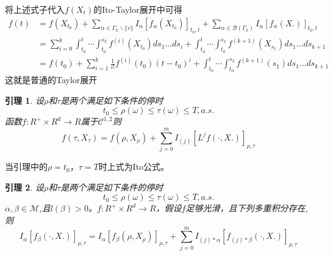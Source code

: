 \documentclass{article}%
\newtheorem{lemma}{\bf 引理}[section]
\begin{document}
将上述式子代入$f(X_t)$的Ito-Taylor展开中可得
\begin{equation}
\begin{aligned}
 f(t)&=f\left(X_{t_{0}}\right)+\sum_{\alpha \in \Gamma_{k} \backslash\{v\}} I_{\alpha}\left[f_{\alpha}\left(X_{t_{0}}\right)\right]_{t_{0}, t}+\sum_{\alpha \in \mathcal{B}\left(\Gamma_{k}\right)} I_{\alpha}\left[f_{\alpha}(X .)\right]_{t_{0}, t}\\
&=\sum_{i=0}^{k} \int_{t_{0}}^{t} \cdots \int_{t_{0}}^{s_{2}} f^{(i)}\left(X_{t_{0}}\right) d s_{1} \ldots d s_{i} 
+\int_{t_{0}}^{t} \cdots \int_{t_{0}}^{s_{2}} f^{(k+1)}\left(X_{s_{1}}\right) d s_{1} \ldots d s_{k+1} \\
&=f\left(t_{0}\right)+\sum_{i=1}^{k} \frac{1}{i !} f^{(i)}\left(t_{0}\right)\left(t-t_{0}\right)^{i}+\int_{t_{0}}^{t} \cdots \int_{t_{0}}^{s_{2}} f^{(k+1)}\left(s_{1}\right) d s_{1} \ldots d s_{k+1}
\end{aligned}
\end{equation}
这就是普通的Taylor展开
\begin{lemma}
	设$\rho$和$\tau$是两个满足如下条件的停时
	$$t_0 \leq \rho(\omega) \leq \tau(\omega) \leq T,a.s.$$
	函数$f: R^{+} \times R^{d} \rightarrow R$属于$\mathcal{C}^{1,2}$则
	\begin{equation}
	f\left(\tau, X_{\tau}\right)=f\left(\rho, X_{\rho}\right)+\sum_{j=0}^{m} I_{(j)}\left[L^{j} f(\cdot, X .)\right]_{\rho, \tau}
	\end{equation}	
\end{lemma}
	当引理中的$\rho=t_0$，$\tau=T$时上式为Ito公式。
\begin{lemma}
	设$\rho$和$\tau$是两个满足如下条件的停时
	$$t_0 \leq \rho(\omega) \leq \tau(\omega) \leq T,a.s.$$
	$\alpha,\beta \in \mathcal{M}$,且$l(\beta)>0$。$f: R^{+} \times R^{d} \rightarrow R$，假设$f$足够光滑，且下列多重积分存在,则
	\begin{equation}
	I_{\alpha}\left[f_{\beta}(\cdot, X .)\right]_{\rho, \tau}=I_{\alpha}\left[f_{\beta}\left(\rho, X_{\rho}\right)\right]_{\rho, \tau}+\sum_{j=0}^{m} I_{(j) * \alpha}\left[f_{(j) * \beta}(\cdot, X .)\right]_{\rho, \tau}
	\end{equation}
\end{lemma}
\end{document}
